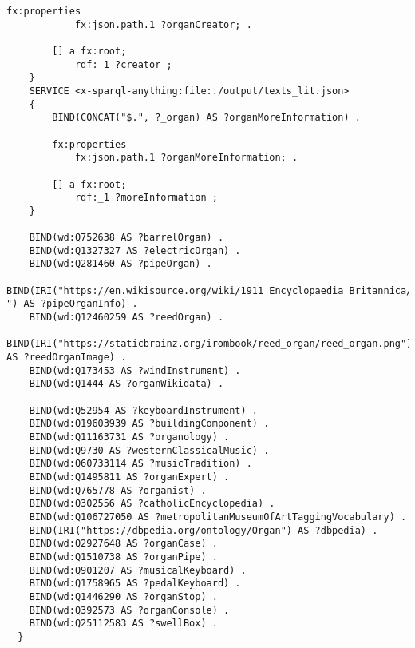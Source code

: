 \begin{lstlisting}[caption={organ-details.sparql}]
		fx:properties
			fx:json.path.1 ?organCreator; .

		[] a fx:root; 
			rdf:_1 ?creator ; 
	} 
	SERVICE <x-sparql-anything:file:./output/texts_lit.json> 
	{
		BIND(CONCAT("$.", ?_organ) AS ?organMoreInformation) .

		fx:properties
			fx:json.path.1 ?organMoreInformation; .

		[] a fx:root; 
			rdf:_1 ?moreInformation ; 
	}

	BIND(wd:Q752638 AS ?barrelOrgan) .
	BIND(wd:Q1327327 AS ?electricOrgan) .
	BIND(wd:Q281460 AS ?pipeOrgan) .
	BIND(IRI("https://en.wikisource.org/wiki/1911_Encyclopaedia_Britannica/Organ ") AS ?pipeOrganInfo) .
	BIND(wd:Q12460259 AS ?reedOrgan) .
	BIND(IRI("https://staticbrainz.org/irombook/reed_organ/reed_organ.png") AS ?reedOrganImage) . 
	BIND(wd:Q173453 AS ?windInstrument) .
	BIND(wd:Q1444 AS ?organWikidata) .

	BIND(wd:Q52954 AS ?keyboardInstrument) .
	BIND(wd:Q19603939 AS ?buildingComponent) .
	BIND(wd:Q11163731 AS ?organology) .
	BIND(wd:Q9730 AS ?westernClassicalMusic) .
	BIND(wd:Q60733114 AS ?musicTradition) .
	BIND(wd:Q1495811 AS ?organExpert) .
	BIND(wd:Q765778 AS ?organist) .
	BIND(wd:Q302556 AS ?catholicEncyclopedia) .
	BIND(wd:Q106727050 AS ?metropolitanMuseumOfArtTaggingVocabulary) .
	BIND(IRI("https://dbpedia.org/ontology/Organ") AS ?dbpedia) .
	BIND(wd:Q2927648 AS ?organCase) .
	BIND(wd:Q1510738 AS ?organPipe) .
	BIND(wd:Q901207 AS ?musicalKeyboard) .
	BIND(wd:Q1758965 AS ?pedalKeyboard) .
	BIND(wd:Q1446290 AS ?organStop) .
	BIND(wd:Q392573 AS ?organConsole) .
	BIND(wd:Q25112583 AS ?swellBox) .
  }
\end{lstlisting}
